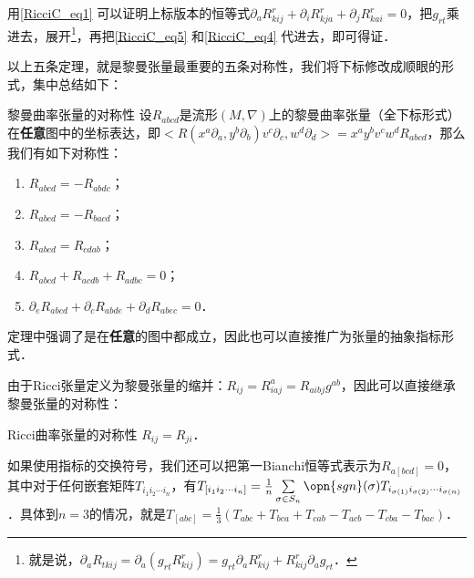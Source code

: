 用\autoref{RicciC_eq1} 可以证明上标版本的恒等式$\partial_aR_{kij}^r+\partial_iR_{kja}^r+\partial_jR_{kai}^r=0$，把$g_{rt}$乘进去，展开\footnote{就是说，$\partial_aR_{tkij}=\partial_a(g_{rt}R^{r}_{kij})=g_{rt}\partial_aR^r_{kij}+R^r_{kij}\partial_ag_{rt}$．}，再把\autoref{RicciC_eq5} 和\autoref{RicciC_eq4} 代进去，即可得证．


以上五条定理，就是黎曼张量最重要的五条对称性，我们将下标修改成顺眼的形式，集中总结如下：

\begin{theorem}{黎曼曲率张量的对称性}
设$R_{abcd}$是流形$(M, \nabla)$上的黎曼曲率张量（全下标形式）在\textbf{任意}图中的坐标表达，即$<R(x^a\partial_a, y^b\partial_b)v^c\partial_c, w^d\partial_d>=x^ay^bv^cw^dR_{abcd}$，那么我们有如下对称性：
\begin{enumerate}
\item $R_{abcd}=-R_{abdc}$；
\item $R_{abcd}=-R_{bacd}$；
\item $R_{abcd}=R_{cdab}$；
\item $R_{abcd}+R_{acdb}+R_{adbc}=0$；
\item $\partial_eR_{abcd}+\partial_cR_{abde}+\partial_dR_{abec}=0$．
\end{enumerate}
\end{theorem}

定理中强调了是在\textbf{任意}的图中都成立，因此也可以直接推广为张量的抽象指标形式．

由于Ricci张量定义为黎曼张量的缩并：$R_{ij}=R^a_{iaj}=R_{aibj}g^{ab}$，因此可以直接继承黎曼张量的对称性：

\begin{theorem}{Ricci曲率张量的对称性}
$R_{ij}=R_{ji}$．
\end{theorem}

如果使用指标的交换符号，我们还可以把第一Bianchi恒等式表示为$R_{a[bcd]}=0$，其中对于任何嵌套矩阵$T_{i_1i_2\cdots i_n}$，有$T_{[i_1i_2\cdots i_n]}=\frac{1}{n}\sum\limits_{\sigma\in S_n}\opn{sgn}(\sigma)T_{i_{\sigma(1)}i_{\sigma(2)}\cdots i_{\sigma(n)}}$．具体到$n=3$的情况，就是$T_{[abc]}=\frac{1}{3}(T_{abc}+T_{bca}+T_{cab}-T_{acb}-T_{cba}-T_{bac})$．








